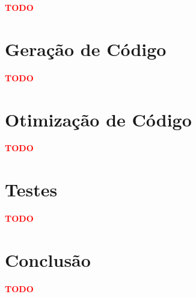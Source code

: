 \documentclass[12pt,a4paper]{report}
\begin{document}
\textcolor{red}{\textbf{TODO}}

\chapter{Geração de Código}

\textcolor{red}{\textbf{TODO}}

\chapter{Otimização de Código}

\textcolor{red}{\textbf{TODO}}

\chapter{Testes}

\textcolor{red}{\textbf{TODO}}

\chapter{Conclusão}

\textcolor{red}{\textbf{TODO}}
\end{document}
